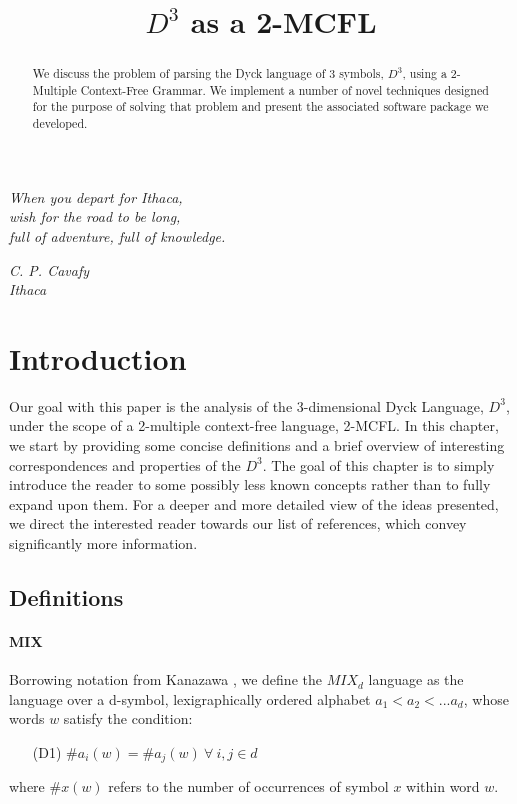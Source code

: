 \documentclass[nonatbib,numbers,10pt]{sigplanconf}
\title{$D^3$ as a 2-MCFL}
\begin{document}
\toappear{}

\maketitle

\begin{abstract}
We discuss the problem of parsing the Dyck language of 3 symbols, $D^3$, using a 2-Multiple Context-Free Grammar. We implement a number of novel techniques designed for the purpose of solving that problem and present the associated software package we developed.
\end{abstract}


\vspace{.18cm}
\epigraph{\textit{When you depart for Ithaca,\\wish for the road to be long,\\full of adventure, full of knowledge.}}{\textit{C. P. Cavafy\\ Ithaca}}

\section{Introduction}\label{sec1}
Our goal with this paper is the analysis of the 3-dimensional Dyck Language, $D^3$, under the scope of a 2-multiple context-free language, 2-MCFL. In this chapter, we start by providing some concise definitions and a brief overview of interesting correspondences and properties of the $D^3$. The goal of this chapter is to simply introduce the reader to some possibly less known concepts rather than to fully expand upon them. For a deeper and more detailed view of the ideas presented, we direct the interested reader towards our list of references, which convey significantly more information.
\subsection{Definitions}
\paragraph{MIX}
Borrowing notation from Kanazawa \cite{kanazawa}, we define the $MIX_d$ language as the language over a d-symbol, lexigraphically ordered alphabet $a_1 < a_2 < ... a_d$, whose words $w$ satisfy the condition:
\begin{itemize}
\item[(D1)]  $ \# a_i(w) = \# a_j(w) \ \forall \ i,j \in d $
\end{itemize}
where $ \#x(w)$ refers to the number of occurrences of symbol $x$ within word $w$.
\end{document}
